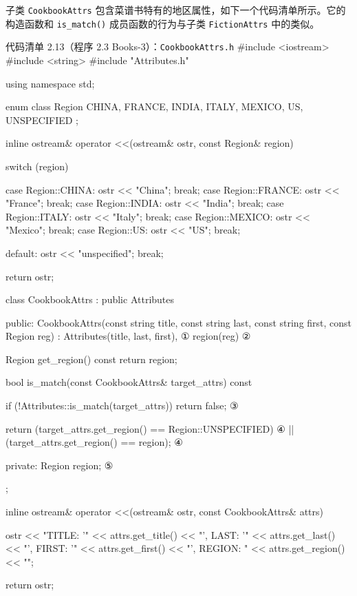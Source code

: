子类 \texttt{Cookbook\allowbreak{}Attrs} 包含菜谱书特有的地区属性，如下一个代码清单所示。它的构造函数和 \texttt{is\_\allowbreak{}match(\allowbreak{})\allowbreak{}} 成员函数的行为与子类 \texttt{Fiction\allowbreak{}Attrs} 中的类似。

\begin{codeboxt}{代码清单 2.13（程序 2.3 Books-3）：\texttt{Cookbook\allowbreak{}Attrs.\allowbreak{}h}}
#include <iostream>
#include <string>
#include "Attributes.h"

using namespace std;

enum class Region
{
    CHINA, FRANCE, INDIA, ITALY, MEXICO, US, UNSPECIFIED
};

inline ostream& operator <<(ostream& ostr, const Region& region)
{
    switch (region)
    {
        case Region::CHINA:  ostr << "China";  break;
        case Region::FRANCE: ostr << "France"; break;
        case Region::INDIA:  ostr << "India";  break;
        case Region::ITALY:  ostr << "Italy";  break;
        case Region::MEXICO: ostr << "Mexico"; break;
        case Region::US:     ostr << "US";     break;

        default: ostr << "unspecified"; break;
    }

    return ostr;
}

class CookbookAttrs : public Attributes
{
public:
    CookbookAttrs(const string title,
                  const string last, const string first,
                  const Region reg)
        : Attributes(title, last, first),                          ①
          region(reg) {}                                           ②

    Region get_region() const { return region; }

    bool is_match(const CookbookAttrs& target_attrs) const
    {
        if (!Attributes::is_match(target_attrs)) return false;     ③

        return (target_attrs.get_region() == Region::UNSPECIFIED)  ④
            || (target_attrs.get_region() == region);              ④
    }

private:
    Region region;                                                 ⑤
};

inline ostream& operator <<(ostream& ostr, const CookbookAttrs& attrs)
{
    ostr << "{TITLE: '"   << attrs.get_title()
         << "', LAST: '"  << attrs.get_last()
         << "', FIRST: '" << attrs.get_first()
         << "', REGION: "  << attrs.get_region() << "}";

    return ostr;
}
\end{codeboxt}
\par
{}\par
{}\par
{}\par
{}\par

